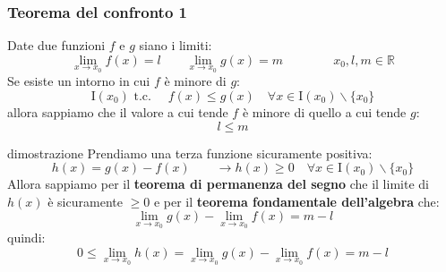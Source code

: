 \documentclass[x11names]{article}
\begin{document}
	
	
	
	\begin{center}
		\colorbox{myred}{\begin{minipage}{5.75in}
				\begin{redes}{}
					\subsubsection{Teorema del confronto 1}
					Date due funzioni $f$ e $g$ siano i limiti:
					\[
					\lim_{x \to x_0} f(x)  = l \qquad \lim_{x \to x_0} g(x)  = m \qquad \qquad x_0,l,m \in \mathbb{R}
					\]
					Se esiste un intorno in cui $f$ è minore di $g$: 
					\[
					\text{I}(x_0) \text{  t.c. } \quad f(x) \leq g(x) \quad \forall x \in \text{I}(x_0) \backslash \{x_0\}
					\]
					allora sappiamo che il valore a cui tende $f$ è minore di quello a cui tende $g$:
					\[
					l \leq m
					\]
				\end{redes}
		\end{minipage}}        
	\end{center}
	
	\begin{es}{dimostrazione}
		Prendiamo una terza funzione sicuramente positiva:
		\[
		h(x) = g(x) - f(x) \qquad \to h(x) \geq 0 \quad \forall x \in \text{I}(x_0) \backslash \{x_0\}
		\]
		Allora sappiamo per il \textbf{teorema di permanenza del segno} che il limite di $h(x)$ è sicuramente $\geq 0$ e per il \textbf{teorema fondamentale dell'algebra} che:
		\[
		\lim_{x \to x_0} g(x)- \lim_{x \to x_0} f(x) = m - l
		\]
		quindi:
		\[
		0 \leq  \lim_{x \to x_0} h(x) = \lim_{x \to x_0} g(x)- \lim_{x \to x_0} f(x) = m - l
		\]
	\end{es}
	
\end{document}
